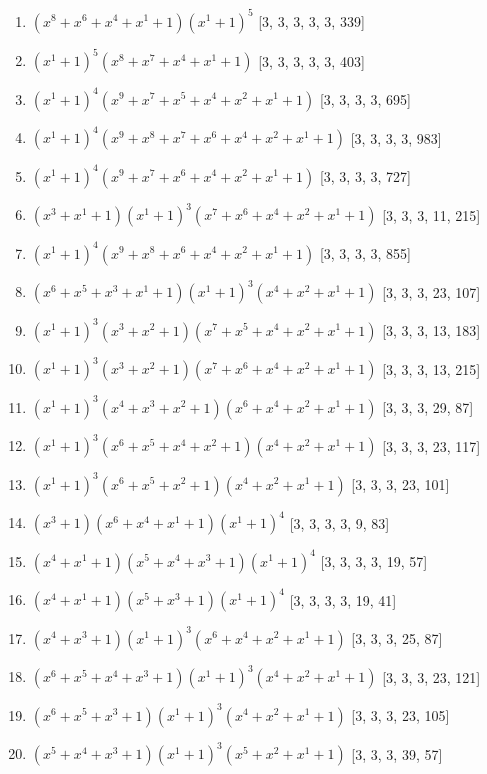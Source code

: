 \documentclass[10pt,twocolumn]{article}
\begin{document}
\begin{enumerate}
\item $(x^{8} + x^{6} + x^{4} + x^{1} + 1)(x^{1} + 1)^{5}$  [3, 3, 3, 3, 3, 339]
\item $(x^{1} + 1)^{5}(x^{8} + x^{7} + x^{4} + x^{1} + 1)$  [3, 3, 3, 3, 3, 403]
\item $(x^{1} + 1)^{4}(x^{9} + x^{7} + x^{5} + x^{4} + x^{2} + x^{1} + 1)$  [3, 3, 3, 3, 695]
\item $(x^{1} + 1)^{4}(x^{9} + x^{8} + x^{7} + x^{6} + x^{4} + x^{2} + x^{1} + 1)$  [3, 3, 3, 3, 983]
\item $(x^{1} + 1)^{4}(x^{9} + x^{7} + x^{6} + x^{4} + x^{2} + x^{1} + 1)$  [3, 3, 3, 3, 727]
\item $(x^{3} + x^{1} + 1)(x^{1} + 1)^{3}(x^{7} + x^{6} + x^{4} + x^{2} + x^{1} + 1)$  [3, 3, 3, 11, 215]
\item $(x^{1} + 1)^{4}(x^{9} + x^{8} + x^{6} + x^{4} + x^{2} + x^{1} + 1)$  [3, 3, 3, 3, 855]
\item $(x^{6} + x^{5} + x^{3} + x^{1} + 1)(x^{1} + 1)^{3}(x^{4} + x^{2} + x^{1} + 1)$  [3, 3, 3, 23, 107]
\item $(x^{1} + 1)^{3}(x^{3} + x^{2} + 1)(x^{7} + x^{5} + x^{4} + x^{2} + x^{1} + 1)$  [3, 3, 3, 13, 183]
\item $(x^{1} + 1)^{3}(x^{3} + x^{2} + 1)(x^{7} + x^{6} + x^{4} + x^{2} + x^{1} + 1)$  [3, 3, 3, 13, 215]
\item $(x^{1} + 1)^{3}(x^{4} + x^{3} + x^{2} + 1)(x^{6} + x^{4} + x^{2} + x^{1} + 1)$  [3, 3, 3, 29, 87]
\item $(x^{1} + 1)^{3}(x^{6} + x^{5} + x^{4} + x^{2} + 1)(x^{4} + x^{2} + x^{1} + 1)$  [3, 3, 3, 23, 117]
\item $(x^{1} + 1)^{3}(x^{6} + x^{5} + x^{2} + 1)(x^{4} + x^{2} + x^{1} + 1)$  [3, 3, 3, 23, 101]
\item $(x^{3} + 1)(x^{6} + x^{4} + x^{1} + 1)(x^{1} + 1)^{4}$  [3, 3, 3, 3, 9, 83]
\item $(x^{4} + x^{1} + 1)(x^{5} + x^{4} + x^{3} + 1)(x^{1} + 1)^{4}$  [3, 3, 3, 3, 19, 57]
\item $(x^{4} + x^{1} + 1)(x^{5} + x^{3} + 1)(x^{1} + 1)^{4}$  [3, 3, 3, 3, 19, 41]
\item $(x^{4} + x^{3} + 1)(x^{1} + 1)^{3}(x^{6} + x^{4} + x^{2} + x^{1} + 1)$  [3, 3, 3, 25, 87]
\item $(x^{6} + x^{5} + x^{4} + x^{3} + 1)(x^{1} + 1)^{3}(x^{4} + x^{2} + x^{1} + 1)$  [3, 3, 3, 23, 121]
\item $(x^{6} + x^{5} + x^{3} + 1)(x^{1} + 1)^{3}(x^{4} + x^{2} + x^{1} + 1)$  [3, 3, 3, 23, 105]
\item $(x^{5} + x^{4} + x^{3} + 1)(x^{1} + 1)^{3}(x^{5} + x^{2} + x^{1} + 1)$  [3, 3, 3, 39, 57]

\end{enumerate}
\end{document}
